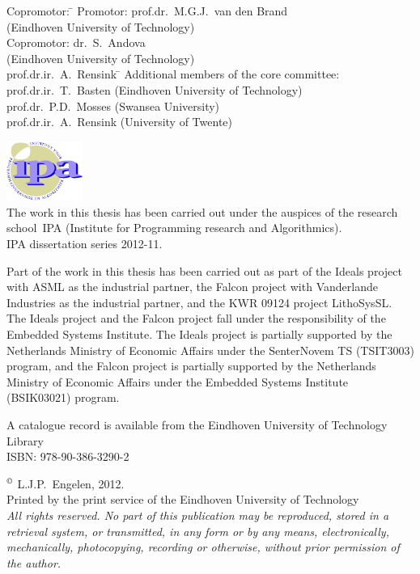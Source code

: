 \newpage
\thispagestyle{empty}
\noindent
\begin{tabbing}
Copromotor: \=\kill
Promotor:	\> prof.dr.\ M.G.J.\ van den Brand \\
    		\> (Eindhoven University of Technology) \\[1ex]
Copromotor: \> dr.\ S.\ Andova\\
    		\> (Eindhoven University of Technology) \\[3ex]
prof.dr.ir.\ A.\ Rensink \=\kill
Additional members of the core committee: \\[1ex]
prof.dr.ir.\ T.\ Basten \>(Eindhoven University of Technology) \\
prof.dr.\ P.D.\ Mosses \>(Swansea University) \\
prof.dr.ir.\ A.\ Rensink \>(University of Twente)\\
\end{tabbing}

\vfill

\noindent
\includegraphics[width=2.5cm]{ipa/ipalogo}
\\[2ex]
The work in this thesis has been carried out under the auspices of the research school~IPA (Institute for Programming research and Algorithmics).\\
IPA dissertation series 2012-11.

\vfill

\noindent
Part of the work in this thesis has been carried out as part of the Ideals project with ASML as the industrial partner, the Falcon project with Vanderlande Industries as the industrial partner, and the KWR 09124 project LithoSysSL.
The Ideals project and the Falcon project fall under the responsibility of the Embedded Systems Institute.
The Ideals project is partially supported by the Netherlands Ministry of Economic Affairs under the SenterNovem TS (TSIT3003) program, and the Falcon project is partially supported by the Netherlands Ministry of Economic Affairs under the Embedded Systems Institute (BSIK03021) program.

\vfill

\noindent
A catalogue record is available from the Eindhoven University of Technology Library\\
ISBN: 978-90-386-3290-2

\vfill

\noindent
$^\copyright$ L.J.P.\ Engelen, 2012.
\\[2ex]
Printed by the print service of the Eindhoven University of Technology \\[2ex]
{
\it
All rights reserved. No part of this publication may be reproduced, stored in a retrieval system, or transmitted, in any form or by any means, electronically, mechanically, photocopying, recording or otherwise, without prior permission of the author.
} 
